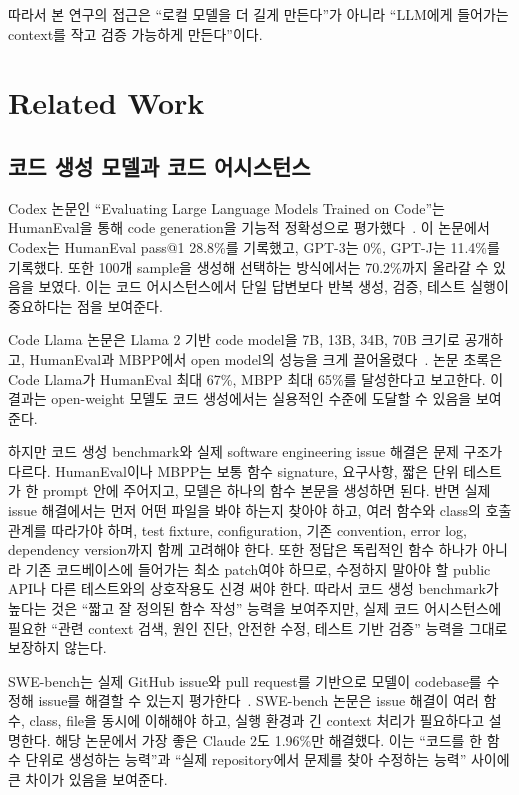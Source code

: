 \documentclass[11pt,a4paper]{article}
\begin{document}
따라서 본 연구의 접근은 ``로컬 모델을 더 길게 만든다''가 아니라 ``LLM에게 들어가는 context를 작고 검증 가능하게 만든다''이다.

\section{Related Work}

\subsection{코드 생성 모델과 코드 어시스턴스}

Codex 논문인 ``Evaluating Large Language Models Trained on Code''는 HumanEval을 통해 code generation을 기능적 정확성으로 평가했다~\cite{chen2021codex}. 이 논문에서 Codex는 HumanEval pass@1 28.8\%를 기록했고, GPT-3는 0\%, GPT-J는 11.4\%를 기록했다. 또한 100개 sample을 생성해 선택하는 방식에서는 70.2\%까지 올라갈 수 있음을 보였다. 이는 코드 어시스턴스에서 단일 답변보다 반복 생성, 검증, 테스트 실행이 중요하다는 점을 보여준다.

Code Llama 논문은 Llama 2 기반 code model을 7B, 13B, 34B, 70B 크기로 공개하고, HumanEval과 MBPP에서 open model의 성능을 크게 끌어올렸다~\cite{roziere2023codellama}. 논문 초록은 Code Llama가 HumanEval 최대 67\%, MBPP 최대 65\%를 달성한다고 보고한다. 이 결과는 open-weight 모델도 코드 생성에서는 실용적인 수준에 도달할 수 있음을 보여준다.

하지만 코드 생성 benchmark와 실제 software engineering issue 해결은 문제 구조가 다르다. HumanEval이나 MBPP는 보통 함수 signature, 요구사항, 짧은 단위 테스트가 한 prompt 안에 주어지고, 모델은 하나의 함수 본문을 생성하면 된다. 반면 실제 issue 해결에서는 먼저 어떤 파일을 봐야 하는지 찾아야 하고, 여러 함수와 class의 호출 관계를 따라가야 하며, test fixture, configuration, 기존 convention, error log, dependency version까지 함께 고려해야 한다. 또한 정답은 독립적인 함수 하나가 아니라 기존 코드베이스에 들어가는 최소 patch여야 하므로, 수정하지 말아야 할 public API나 다른 테스트와의 상호작용도 신경 써야 한다. 따라서 코드 생성 benchmark가 높다는 것은 ``짧고 잘 정의된 함수 작성'' 능력을 보여주지만, 실제 코드 어시스턴스에 필요한 ``관련 context 검색, 원인 진단, 안전한 수정, 테스트 기반 검증'' 능력을 그대로 보장하지 않는다.

SWE-bench는 실제 GitHub issue와 pull request를 기반으로 모델이 codebase를 수정해 issue를 해결할 수 있는지 평가한다~\cite{jimenez2023swebench}. SWE-bench 논문은 issue 해결이 여러 함수, class, file을 동시에 이해해야 하고, 실행 환경과 긴 context 처리가 필요하다고 설명한다. 해당 논문에서 가장 좋은 Claude 2도 1.96\%만 해결했다. 이는 ``코드를 한 함수 단위로 생성하는 능력''과 ``실제 repository에서 문제를 찾아 수정하는 능력'' 사이에 큰 차이가 있음을 보여준다.
\end{document}
